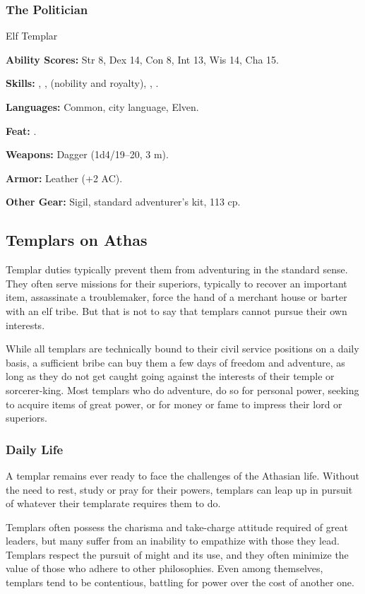 \subsubsection{The Politician}
Elf Templar

\textbf{Ability Scores:} Str 8, Dex 14, Con 8, Int 13, Wis 14, Cha 15.

\textbf{Skills:} , ,  (nobility and royalty), , .

\textbf{Languages:} Common, city language, Elven.

\textbf{Feat:} .

\textbf{Weapons:} Dagger (1d4/19--20, 3 m).

\textbf{Armor:} Leather (+2 AC).

\textbf{Other Gear:} Sigil, standard adventurer's kit, 113 cp.


\subsection{Templars on Athas}
Templar duties typically prevent them from adventuring in the standard sense. They often serve missions for their superiors, typically to recover an important item, assassinate a troublemaker, force the hand of a merchant house or barter with an elf tribe. But that is not to say that templars cannot pursue their own interests.

While all templars are technically bound to their civil service positions on a daily basis, a sufficient bribe can buy them a few days of freedom and adventure, as long as they do not get caught going against the interests of their temple or sorcerer-king. Most templars who do adventure, do so for personal power, seeking to acquire items of great power, or for money or fame to impress their lord or superiors.

\subsubsection{Daily Life}
A templar remains ever ready to face the challenges of the Athasian life. Without the need to rest, study or pray for their powers, templars can leap up in pursuit of whatever their templarate requires them to do.

Templars often possess the charisma and take-charge attitude required of great leaders, but many suffer from an inability to empathize with those they lead. Templars respect the pursuit of might and its use, and they often minimize the value of those who adhere to other philosophies. Even among themselves, templars tend to be contentious, battling for power over the cost of another one.

